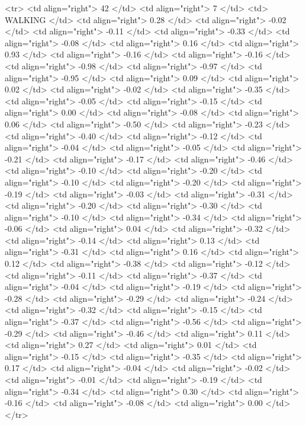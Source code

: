   <tr> <td align="right"> 42 </td> <td align="right">   7 </td> <td> WALKING </td> <td align="right"> 0.28 </td> <td align="right"> -0.02 </td> <td align="right"> -0.11 </td> <td align="right"> -0.33 </td> <td align="right"> -0.08 </td> <td align="right"> 0.16 </td> <td align="right"> 0.93 </td> <td align="right"> -0.16 </td> <td align="right"> -0.16 </td> <td align="right"> -0.98 </td> <td align="right"> -0.97 </td> <td align="right"> -0.95 </td> <td align="right"> 0.09 </td> <td align="right"> 0.02 </td> <td align="right"> -0.02 </td> <td align="right"> -0.35 </td> <td align="right"> -0.05 </td> <td align="right"> -0.15 </td> <td align="right"> 0.00 </td> <td align="right"> -0.08 </td> <td align="right"> 0.06 </td> <td align="right"> -0.50 </td> <td align="right"> -0.23 </td> <td align="right"> -0.40 </td> <td align="right"> -0.12 </td> <td align="right"> -0.04 </td> <td align="right"> -0.05 </td> <td align="right"> -0.21 </td> <td align="right"> -0.17 </td> <td align="right"> -0.46 </td> <td align="right"> -0.10 </td> <td align="right"> -0.20 </td> <td align="right"> -0.10 </td> <td align="right"> -0.20 </td> <td align="right"> -0.19 </td> <td align="right"> -0.03 </td> <td align="right"> -0.31 </td> <td align="right"> -0.20 </td> <td align="right"> -0.30 </td> <td align="right"> -0.10 </td> <td align="right"> -0.34 </td> <td align="right"> -0.06 </td> <td align="right"> 0.04 </td> <td align="right"> -0.32 </td> <td align="right"> -0.14 </td> <td align="right"> 0.13 </td> <td align="right"> -0.31 </td> <td align="right"> 0.16 </td> <td align="right"> 0.12 </td> <td align="right"> -0.38 </td> <td align="right"> -0.12 </td> <td align="right"> -0.11 </td> <td align="right"> -0.37 </td> <td align="right"> -0.04 </td> <td align="right"> -0.19 </td> <td align="right"> -0.28 </td> <td align="right"> -0.29 </td> <td align="right"> -0.24 </td> <td align="right"> -0.32 </td> <td align="right"> -0.15 </td> <td align="right"> -0.37 </td> <td align="right"> -0.56 </td> <td align="right"> -0.29 </td> <td align="right"> -0.46 </td> <td align="right"> 0.11 </td> <td align="right"> 0.27 </td> <td align="right"> 0.01 </td> <td align="right"> -0.15 </td> <td align="right"> -0.35 </td> <td align="right"> 0.17 </td> <td align="right"> -0.04 </td> <td align="right"> -0.02 </td> <td align="right"> -0.01 </td> <td align="right"> -0.19 </td> <td align="right"> -0.34 </td> <td align="right"> 0.30 </td> <td align="right"> -0.16 </td> <td align="right"> -0.08 </td> <td align="right"> 0.00 </td> </tr>
